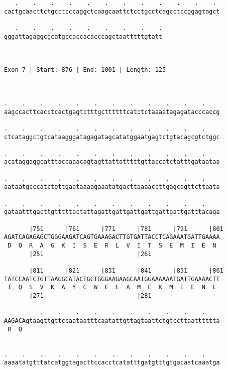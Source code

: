 \documentclass{article}
\begin{document}
\begin{Verbatim}
   .    .    .    .    .    .    .    .    .    .    .    . 
cactgcaacttctgcctcccaggctcaagcaattctcctgcctcagcctccggagtagct
                                                            
   .    .    .    .    .    .    .    .    .
gggattagaggcgcatgccaccacacccagctaatttttgtatt
                                            
                                            
 
Exon 7 | Start: 876 | End: 1001 | Length: 125



.    .    .    .    .    .    .    .    .    .    .    .    
aagccacttcacctcactgagtctttgcttttttcatctctaaaatagagatacccaccg
                                                            
.    .    .    .    .    .    .    .    .    .    .    .    
ctcataggctgtcataagggatagagatagcatatggaatgagtctgtacagcgtctggc
                                                            
.    .    .    .    .    .    .    .    .    .    .    .    
acataggaggcatttaccaaacagtagttattatttttgttaccatctatttgataataa
                                                            
.    .    .    .    .    .    .    .    .    .    .    .    
aataatgcccatctgttgaataaaagaaatatgacttaaaaccttgagcagttcttaata
                                                            
.    .    .    .    .    .    .    .    .    .    .    .    
gataatttgacttgtttttactattagattgattgattgattgattgattgatttacaga
                                                            
       |751      |761      |771      |781      |791      |801
AGATCAGAGAGCTGGGAAGATCAGTGAAAGACTTGTGATTACCTCAGAAATGATTGAAAA
 D  Q  R  A  G  K  I  S  E  R  L  V  I  T  S  E  M  I  E  N 
       |251                          |261                   
  
       |811      |821      |831      |841      |851      |861
TATCCAATCTGTTAAGGCATACTGCTGGGAAGAAGCAATGGAAAAAATGATTGAAAACTT
 I  Q  S  V  K  A  Y  C  W  E  E  A  M  E  K  M  I  E  N  L 
       |271                          |281                   
  
          .    .    .    .    .    .    .    .    .    .    
AAGACAgtaagttgttccaataatttcaatattgttagtaattctgtccttaatttttta
 R  Q                                                       
                                                            
  
.    .    .    .    .    .    .    .    .    .    .    .    
aaaatatgtttatcatggtagacttccacctcatatttgatgtttgtgacaatcaaatga
                                                            

\end{Verbatim}
\end{document}
